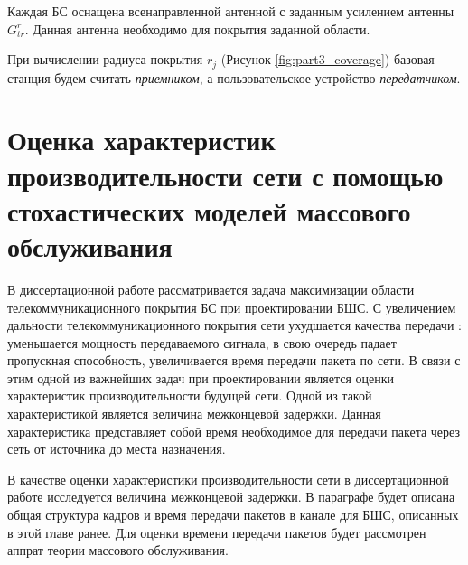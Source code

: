 Каждая БС оснащена всенаправленной антенной с заданным усилением антенны $G_ {tr}^{r}$. Данная антенна необходимо для покрытия заданной области.


При вычислении радиуса покрытия $r_j$ (Рисунок  \cref{fig:part3_coverage}) базовая станция будем считать \textit{приемником}, а пользовательское устройство  \textit{передатчиком}.

\section{Оценка характеристик производительности сети с помощью стохастических моделей массового обслуживания}

В диссертационной работе рассматривается задача максимизации области телекоммуникационного покрытия БС при проектировании БШС.  С увеличением дальности телекоммуникационного покрытия сети ухудшается качества передачи : уменьшается мощность передаваемого сигнала, в свою очередь падает пропускная способность, увеличивается время передачи пакета по сети. В связи с этим одной из важнейших задач при проектировании является оценки характеристик производительности будущей сети. Одной из такой характеристикой является величина межконцевой задержки. Данная характеристика представляет собой время необходимое для передачи пакета через сеть от источника до места назначения.

В качестве оценки характеристики производительности сети в диссертационной работе исследуется величина межконцевой задержки.  В параграфе будет описана общая структура кадров и время передачи пакетов в канале для БШС, описанных в этой главе ранее. Для оценки времени передачи пакетов будет рассмотрен аппрат теории массового обслуживания.



